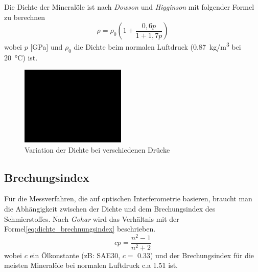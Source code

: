 Die Dichte der Mineralöle ist nach \textit{Dowson} und \textit{Higginson} \cite{dowson_1966} mit folgender Formel zu berechnen
\begin{equation}
    \label{eq:dichte_hirano}
    \rho = \rho_0 \left( 1 + \frac{0,6  p}{1 + 1,7  p} \right)
\end{equation}
%
wobei $p$ [\si{GPa}] und $\rho_0$ die Dichte beim normalen Luftdruck (\SI{0,87}{kg/m^3} bei \SI{20}{\degreeCelsius}) ist.
\begin{figure}[htb]
    \centering
    \includegraphics[width=5cm]{./images/blank_img.jpg}
    \caption{Variation der Dichte bei verschiedenen Drücke}
    \label{fig:variation_der_dichte_bei_verschiedenen_druecke}
\end{figure}

\subsection*{Brechungsindex}
\label{sub:brechungsindex}

Für die Messverfahren, die auf optischen Interferometrie basieren, braucht man die Abhängigkeit zwischen der Dichte und dem Brechungsindex des Schmierstoffes.
Nach \textit{Gohar} \cite{gohar_1966} wird das Verhältnis mit der Formel\ref{eq:dichte_brechnungsindex} beschrieben.
\begin{equation}
    \label{eq:dichte_brechnungsindex}
    c  p = \frac{n^2 - 1}{n^2 + 2}
\end{equation}
%
wobei $c$ ein Ölkonstante (zB: SAE30, $c = $ \num{0,33}) und der Brechungsindex für die meisten Mineralöle bei normalen Luftdruck c.a \num{1.51} ist.

